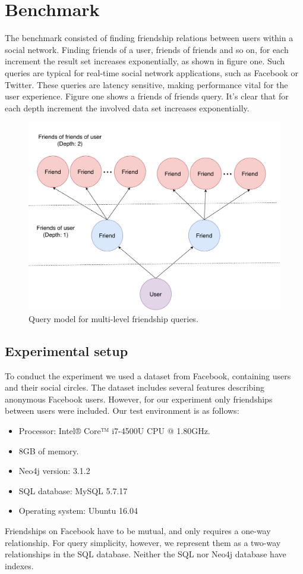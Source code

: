 \documentclass[a4paper, 12pt, conference]{IEEEtran}
\begin{document}
\section{Benchmark}
The benchmark consisted of finding friendship relations between users within a social network.
Finding friends of a user, friends of friends and so on, for each increment the result set increases exponentially, as shown in figure one.
Such queries are typical for real-time social network applications, such as Facebook or Twitter. These queries are latency sensitive, making performance vital for the user experience.
Figure one shows a friends of friends query. It's clear that for each depth increment the involved data set increases exponentially.
\begin{figure}[h]
	\centering
	\includegraphics[scale=0.28]{friends.pdf}
	\caption{Query model for multi-level friendship queries.}
	\label{fig:friend_query}
\end{figure}
\subsection{Experimental setup}
To conduct the experiment we used a dataset from Facebook, containing users and their social circles.
The dataset includes several features describing anonymous Facebook users. However, for our experiment only friendships between users were included.
Our test environment is as follows: 
\begin{itemize}
	\item Processor: Intel® Core™ i7-4500U CPU @ 1.80GHz.
	\item 8GB of memory. 
	\item Neo4j version: 3.1.2
	\item SQL database: MySQL 5.7.17
	\item Operating system: Ubuntu 16.04
\end{itemize}
Friendships on Facebook have to be mutual, and only requires a one-way relationship. For query simplicity, however, we represent them as a two-way relationships in the SQL database.
Neither the SQL nor Neo4j database have indexes.
\end{document}
